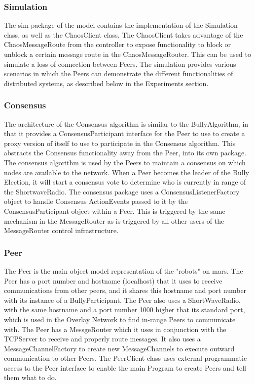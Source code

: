 \documentclass[10pt,letterpaper]{article}
\begin{document}
    \subsubsection{Simulation}
    The sim package of the model contains the implementation of the Simulation class, as well as the ChaosClient class. The ChaosClient takes advantage of the ChaosMessageRoute from the controller to expose functionality to block or unblock a certain message route in the ChaosMessageRouter. This can be used to simulate a loss of connection between Peers. The simulation provides various scenarios in which the Peers can demonstrate the different functionalities of distributed systems, as described below in the Experiments section.
    \subsubsection{Consensus}
    The architecture of the Consensus algorithm is similar to the BullyAlgorithm, in that it provides a ConsensusParticipant interface for the Peer to use to create a proxy version of itself to use to participate in the Consensus algorithm. This abstracts the Consensus functionality away from the Peer, into its own package. The consensus algorithm is used by the Peers to maintain a consensus on which nodes are available to the network. When a Peer becomes the leader of the Bully Election, it will start a consensus vote to determine who is currently in range of the ShortwaveRadio. The consensus package uses a ConsensusListenerFactory object to handle Consensus ActionEvents passed to it by the ConsensusParticipant object within a Peer. This is triggered by the same mechanism in the MessageRouter as is triggered by all other users of the MessageRouter control infrastructure.
    \subsubsection{Peer}
    The Peer is the main object model representation of the "robots" on mars. The Peer has a port number and hostname (localhost) that it uses to receive communications from other peers, and it shares this hostname and port number with its instance of a BullyParticipant. The Peer also uses a ShortWaveRadio, with the same hostname and a port number 1000 higher that its standard port, which is used in the Overlay Network to find in-range Peers to communicate with. The Peer has a MessgeRouter which it uses in conjunction with the TCPServer to receive and properly route messages. It also uses a MessageChannelFactory to create new MessageChannels to execute outward communication to other Peers. The PeerClient class uses external programmatic access to the Peer interface to enable the main Program to create Peers and tell them what to do.
    
\end{document}
